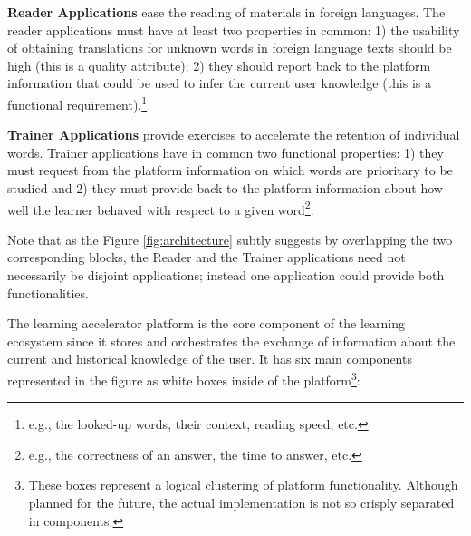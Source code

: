 \begin{description}
	
	\item {\bf Reader Applications} ease the reading of materials in foreign languages. The reader applications must have at least two properties in common: 
		1) the usability of obtaining translations for unknown words in foreign language texts should be high (this is a quality attribute); 
		2) they should report back to the platform information that could be used to infer the current user knowledge (this is a functional requirement).\footnote{e.g., the looked-up words, their context, reading speed, etc.} 

	\item {\bf Trainer Applications} provide exercises to accelerate the retention of individual words. Trainer applications have in common two functional properties: 
		1) they must request from the platform information on which words are prioritary to be studied and 
		2) they must provide back to the platform information about how well the learner behaved with respect to a given word\footnote{e.g., the correctness of an answer, the time to answer, etc.}.

\end{description}

Note that as the Figure \ref{fig:architecture} subtly suggests by overlapping the two corresponding blocks, the Reader and the Trainer applications need not necessarily be disjoint applications; instead one application could provide both functionalities.


The learning accelerator platform is the core component of the learning ecosystem since it stores and orchestrates the exchange of information about the current and historical knowledge of the user. It has six main components represented in the figure as white boxes inside of the platform\footnote{These boxes represent a logical clustering of platform functionality. Although planned for the future, the actual implementation is not so crisply separated in components.}: 


